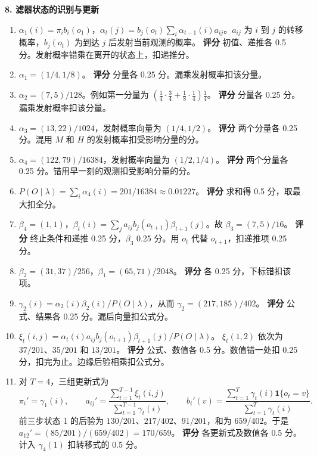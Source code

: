 \noindent\textbf{8. 滤器状态的识别与更新}
\begin{enumerate}[label=(\arabic*)]
\item $\alpha_1(i)=\pi_i b_i(o_1)$，$\alpha_t(j)=b_j(o_t)\sum_i\alpha_{t-1}(i)a_{ij}$。$a_{ij}$ 为 $i$ 到 $j$ 的转移概率，$b_j(o_t)$ 为到达 $j$ 后发射当前观测的概率。
\textbf{评分} 初值、递推各 0.5 分。发射概率错乘在离开的状态上，扣递推分。
\item $\alpha_1=(1/4,1/8)$。
\textbf{评分} 分量各 0.25 分。漏乘发射概率扣该分量。
\item $\alpha_2=(7,5)/128$。例如第一分量为 $(\frac14\cdot\frac34+\frac18\cdot\frac14)\frac14$。
\textbf{评分} 分量各 0.25 分。漏乘发射概率扣该分量。
\item $\alpha_3=(13,22)/1024$，发射概率向量为 $(1/4,1/2)$。
\textbf{评分} 两个分量各 0.25 分。混用 $M$ 和 $H$ 的发射概率扣受影响分量的分。
\item $\alpha_4=(122,79)/16384$，发射概率向量为 $(1/2,1/4)$。
\textbf{评分} 两个分量各 0.25 分。错用早一刻的观测扣受影响分量的分。
\item $P(O\mid\lambda)=\sum_i\alpha_4(i)=201/16384\approx0.01227$。
\textbf{评分} 求和得 0.5 分，取最大扣全分。
\item $\beta_4=(1,1)$，$\beta_t(i)=\sum_j a_{ij}b_j(o_{t+1})\beta_{t+1}(j)$。故 $\beta_3=(7,5)/16$。
\textbf{评分} 终止条件和递推 0.25 分，$\beta_3$ 0.25 分。用 $o_t$ 代替 $o_{t+1}$，扣递推项 0.25 分。
\item $\beta_2=(31,37)/256$，$\beta_1=(65,71)/2048$。
\textbf{评分} 各 0.25 分，下标错扣该项。
\item $\gamma_2(i)=\alpha_2(i)\beta_2(i)/P(O\mid\lambda)$，从而 $\gamma_2=(217,185)/402$。
\textbf{评分} 公式、结果各 0.25 分。漏后向量扣公式分。
\item $\xi_t(i,j)=\alpha_t(i)a_{ij}b_j(o_{t+1})\beta_{t+1}(j)/P(O\mid\lambda)$。
$\xi_t(1,2)$ 依次为 $37/201$、$35/201$ 和 $13/201$。
\textbf{评分} 公式、数值各 0.5 分。数值错一处扣 0.25 分，扣完为止。边缘后验相乘扣公式分。
\item 对 $T=4$，三组更新式为
\[
 \pi_i'=\gamma_1(i),\qquad
 a_{ij}'=\frac{\sum_{t=1}^{T-1}\xi_t(i,j)}{\sum_{t=1}^{T-1}\gamma_t(i)},\qquad
 b_i'(v)=\frac{\sum_{t=1}^{T}\gamma_t(i)\mathbf{1}\{o_t=v\}}{\sum_{t=1}^{T}\gamma_t(i)}.
\]
前三步状态 1 的后验为 $130/201$、$217/402$、$91/201$，和为 $659/402$。于是 $a_{12}'=(85/201)/(659/402)=170/659$。
\textbf{评分} 各更新式及数值各 0.5 分。计入 $\gamma_4(1)$ 扣转移式的 0.5 分。
\end{enumerate}
